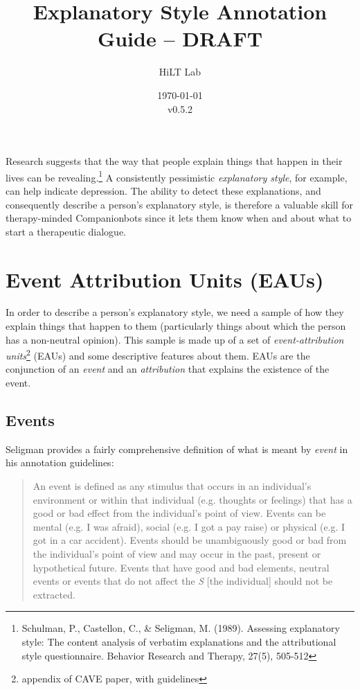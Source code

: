 \documentclass[a4paper,12pt]{article}
\begin{document}
\title{Explanatory Style Annotation Guide -- DRAFT}
\author{HiLT Lab}
\date{\today\\v0.5.2}
\maketitle

\tableofcontents
\break

Research suggests that the way that people explain things that happen in their lives can be revealing.\footnote{\label{seligman89}Schulman, P., Castellon, C., \& Seligman, M. (1989). Assessing explanatory style: The content analysis of verbatim explanations and the attributional style questionnaire. Behavior Research and Therapy, 27(5), 505-512} %
A consistently pessimistic \emph{explanatory style}, for example, can help indicate depression.
The ability to detect these explanations, and consequently describe a person's explanatory style, is therefore a valuable skill for therapy-minded Companionbots since it lets them know when and about what to start a therapeutic dialogue.

\section{Event Attribution Units (EAUs)}
In order to describe a person's explanatory style, we need a sample of how they explain things that happen to them (particularly things about which the person has a non-neutral opinion). %
This sample is made up of a set of \emph{event-attribution units}\footnote{\label{CAVE}appendix of CAVE paper, with guidelines} (EAUs) and some descriptive features about them. %
EAUs are the conjunction of an \emph{event} and an \emph{attribution} that explains the existence of the event.


\subsection{Events}

Seligman provides a fairly comprehensive definition of what is meant by \emph{event} in his annotation guidelines: %

\begin{quote}
    An event is defined as any stimulus that occurs in an individual's environment or within that individual (e.g. thoughts or feelings) that has a good or bad effect from the individual's point of view.
    Events can be mental (e.g. I was afraid), social (e.g. I got a pay raise) or physical (e.g. I got in a car accident).
    Events should be unambiguously good or bad from the individual's point of view and may occur in the past, present or hypothetical future.
    Events that have good and bad elements, neutral events or events that do not affect the \emph{S} [the individual] should not be extracted.
\end{quote}
\end{document}
